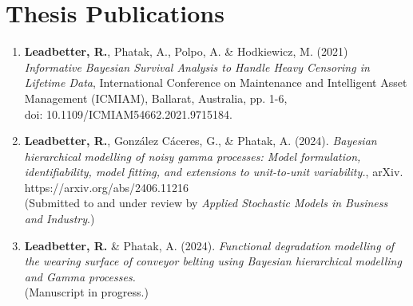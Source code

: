 
\chapter*{Thesis Publications}  \label{chap:publications}

\begin{enumerate}
  \item \textbf{Leadbetter, R.}, Phatak, A., Polpo, A. \& Hodkiewicz, M. (2021) \textit{Informative Bayesian Survival Analysis to Handle Heavy Censoring in Lifetime Data}, International Conference on Maintenance and Intelligent Asset Management (ICMIAM), Ballarat, Australia, pp. 1-6,\\ doi: 10.1109/ICMIAM54662.2021.9715184.
  \item \textbf{Leadbetter, R.}, Gonz\'{a}lez C\'{a}ceres, G., \& Phatak, A. (2024). \textit{Bayesian hierarchical modelling of noisy gamma processes: Model formulation, identifiability, model fitting, and extensions to unit-to-unit variability.}, arXiv. https://arxiv.org/abs/2406.11216 \\
  (Submitted to and under review by \textit{Applied Stochastic Models in Business and Industry}.)
  \item \textbf{Leadbetter, R.} \& Phatak, A. (2024). \textit{Functional degradation modelling of the wearing surface of conveyor belting using Bayesian hierarchical modelling and Gamma processes.} \\
  (Manuscript in progress.)
\end{enumerate}